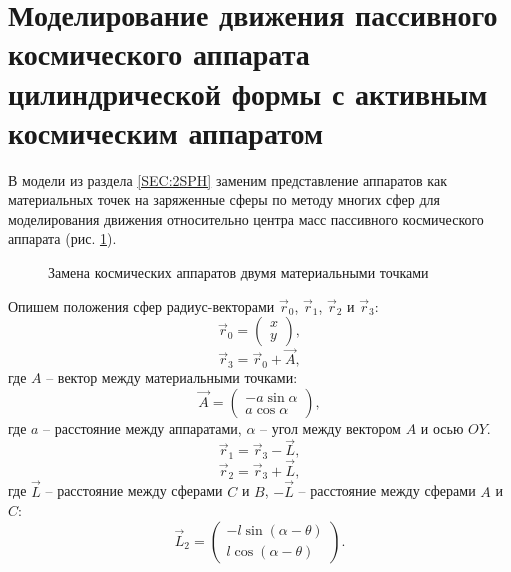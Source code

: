 \section{Моделирование движения пассивного космического аппарата цилиндрической формы с активным космическим аппаратом}
\label{SEC:2SPH_MSM}

В модели из раздела \ref{SEC:2SPH} заменим представление аппаратов как материальных точек на заряженные сферы по методу многих сфер для моделирования движения относительно центра масс пассивного космического аппарата (рис. \ref{ris:2sph_msm}).

\begin{figure}[H]
	\caption{Замена космических аппаратов двумя материальными точками}
	\label{ris:2sph_msm}
\end{figure}

Опишем положения сфер радиус-векторами $\vec{r}_0$, $\vec{r}_1$, $\vec{r}_2$ и $\vec{r}_3$:
\begin{equation}
\label{eq:2sph_msm_r0}
	\vec{r}_0 = 
	\begin{pmatrix}
		x\\
		y
	\end{pmatrix},
\end{equation}
\begin{equation}
\label{eq:2sph_msm_r3}
	\vec{r}_3 = \vec{r}_0 + \vec{A},
\end{equation}
где $A$ – вектор между материальными точками:
\begin{equation}
\label{eq:2sph_msm_A}
	\vec{A} = 
	\begin{pmatrix}
		- a \sin \alpha \\
		a \cos \alpha
	\end{pmatrix},
\end{equation}
где $a$ – расстояние между аппаратами, $\alpha$ – угол между вектором $A$ и осью $OY$.
\begin{equation}
\label{eq:2sph_msm_r1}
	\vec{r}_1 = \vec{r}_3 - \vec{L},
\end{equation}
\begin{equation}
\label{eq:2sph_msm_r2}
	\vec{r}_2 = \vec{r}_3 + \vec{L},
\end{equation}
где $\vec{L}$ – расстояние между сферами $C$ и $B$, $-\vec{L}$ – расстояние между сферами $A$ и $C$:
\begin{equation}
\label{eq:2sph_msm_L}
	\vec{L}_2 = 
	\begin{pmatrix}
		-l \sin(\alpha - \theta)\\
		l \cos(\alpha - \theta)
	\end{pmatrix}.
\end{equation}

